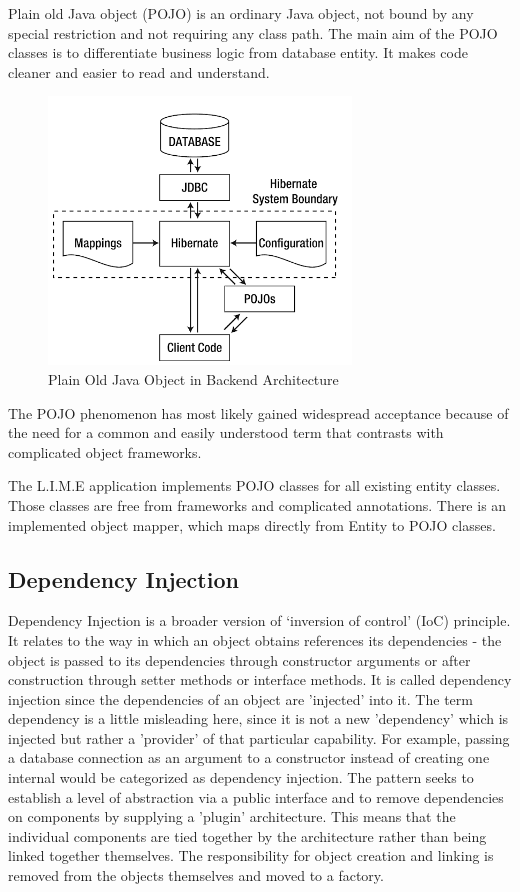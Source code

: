 \documentclass[a4paper,11pt,twoside]{report}
\theoremstyle{definition}
\begin{document}
Plain old Java object (POJO) is an ordinary Java object, not bound by any special restriction and not requiring any class path. 
The main aim of the POJO classes is to differentiate business logic from database entity. It makes code cleaner and easier to read and understand.

\begin{figure}[h!]

\begin{center}

\includegraphics[scale=1]{pojo}

\end{center}
\caption{Plain Old Java Object in Backend Architecture}
\end{figure}
The POJO phenomenon has most likely gained widespread acceptance because of the need for a common and easily understood term that contrasts with complicated object frameworks. 
 

The L.I.M.E application implements POJO classes for all existing entity classes. Those classes are free from frameworks and complicated annotations. There is an implemented object mapper, which maps directly from Entity to POJO classes.



\subsection{Dependency Injection}

Dependency Injection is a broader version of ‘inversion of control’ (IoC) principle. It relates to the way in which an object obtains references its dependencies - the object is passed to its dependencies through constructor arguments or after construction through setter methods or interface methods. It is called dependency injection since the dependencies of an object are 'injected' into it. The term dependency is a little misleading here, since it is not a new 'dependency' which is injected but rather a 'provider' of that particular capability. For example, passing a database connection as an argument to a constructor instead of creating one internal would be categorized as dependency injection.
The pattern seeks to establish a level of abstraction via a public interface and to remove dependencies on components by supplying a 'plugin' architecture. This means that the individual components are tied together by the architecture rather than being linked together themselves. The responsibility for object creation and linking is removed from the objects themselves and moved to a factory.
\end{document}
